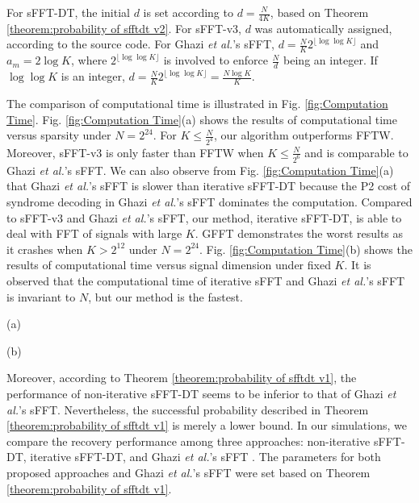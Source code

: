 \documentclass[journal,onecolumn,11pt]{IEEEtran}
\begin{document}
For sFFT-DT, the initial $d$ is set according to $  d=\frac{N}{4K}$, based on Theorem \ref{theorem:probability of sfftdt v2}.
For sFFT-v3, $d$ was automatically assigned, according to the source code.
For Ghazi {\em et al.}'s sFFT, $  d=\frac{N}{K} 2^{\lfloor \log\log K \rfloor}$ and $a_{m}=2\log K$, where $2^{\lfloor \log\log K \rfloor}$ is involved to enforce $  \frac{N}{d}$ being an integer.
If $\log\log K$ is an integer, $  d=\frac{N}{K} 2^{\lfloor \log\log K \rfloor}= \frac{N\log K}{K}$.

The comparison of computational time is illustrated in Fig. \ref{fig:Computation Time}.
Fig. \ref{fig:Computation Time}(a) shows the results of computational time versus sparsity under $N=2^{24}$.
For $  K\leq\frac{N}{2^{4}}$, our algorithm outperforms FFTW.
Moreover, sFFT-v3 \cite{Haitham2012}\cite{Haitham2012_1} is only faster than FFTW when $  K\leq\frac{N}{2^{6}}$ and is comparable to Ghazi {\em et al.}'s sFFT.
We can also observe from Fig. \ref{fig:Computation Time}(a) that Ghazi {\em et al.}'s sFFT is slower than iterative sFFT-DT because the P2 cost of syndrome decoding in Ghazi {\em et al.}'s sFFT dominates the computation.
Compared to sFFT-v3 and Ghazi {\em et al.}'s sFFT, our method, iterative sFFT-DT, is able to deal with FFT of signals with large $K$.
GFFT demonstrates the worst results as it crashes when $K>2^{12}$ under $N=2^{24}$.
Fig. \ref{fig:Computation Time}(b) shows the results of computational time versus signal dimension under fixed $K$.
It is observed that the computational time of iterative sFFT and Ghazi {\em et al.}'s sFFT is invariant to $N$, but our method is the fastest.

\begin{figure*}[!t]
\begin{minipage}[b]{.48\linewidth}
  \centerline{(a)}
\end{minipage}
\begin{minipage}[b]{.48\linewidth}
  \centerline{(b)}
\end{minipage}
\hfill
\caption{Comparison of computational time for exact K-sparse signals. (a) Computational time vs. sparsity under $N=2^{24}$. (b) Computational time vs. signal dimension under $K=2^{16}$ and $a_{m}=4$.}
\label{fig:Computation Time}
\end{figure*}

Moreover, according to Theorem \ref{theorem:probability of sfftdt v1}, the performance of non-iterative sFFT-DT seems to be inferior to that of Ghazi {\em et al.}'s sFFT.
Nevertheless, the successful probability described in Theorem \ref{theorem:probability of sfftdt v1} is merely a lower bound.
In our simulations, we compare the recovery performance among three approaches: non-iterative sFFT-DT, iterative sFFT-DT, and Ghazi {\em et al.}'s sFFT \cite{Ghazi2013}.
The parameters for both proposed approaches and Ghazi {\em et al.}'s sFFT were set based on Theorem \ref{theorem:probability of sfftdt v1}.
\end{document}
